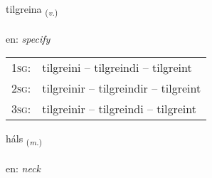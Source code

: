 \documentclass[frontgrid, backgrid]{flacards}\usepackage[]{graphicx}\usepackage[]{color}
\begin{document}
\renewcommand{\flhead}{\vskip5pt \fboxsep=0pt {\small\bfseries\footnotesize Sagnorð | Verb}}
\renewcommand{\fcfoot}{\vskip5pt \fboxsep=0pt \hspace{2pt}{\small\bfseries\footnotesize 2K}}

\renewcommand{\blhead}{\vskip5pt {\small\bfseries\footnotesize Sagnorð | Verb }}
\renewcommand{\bcfoot}{\vskip5pt \hspace{2pt}{\small\bfseries\footnotesize 2K}}


{tilgreina \small{\textsubscript{(\textit{v.})}} \\[1ex] %
\textphonetic{[tʰɪlkreina]} \\
en: \emph{specify} \\  [2ex]
\renewcommand*{\arraystretch}{0.8}
\begin{tabular}{p{1cm}l}
\textsc{1sg}: & tilgreini -- tilgreindi -- tilgreint \\ 
\textsc{2sg}: & tilgreinir -- tilgreindir -- tilgreint \\ 
\textsc{3sg}: & tilgreinir -- tilgreindi -- tilgreint \\ 
\end{tabular}
}

\renewcommand{\flhead}{\vskip5pt \fboxsep=0pt {\small\bfseries\footnotesize Nafnorð | Noun}}
\renewcommand{\fcfoot}{\vskip5pt \fboxsep=0pt \hspace{2pt}{\small\bfseries\footnotesize 2K}}

\renewcommand{\blhead}{\vskip5pt {\small\bfseries\footnotesize Nafnorð | Noun }}
\renewcommand{\bcfoot}{\vskip5pt \hspace{2pt}{\small\bfseries\footnotesize 2K}}


{háls \small{\textsubscript{(\textit{m.})}} \\[1ex] %
\textphonetic{[hauls]} \\
en: \emph{neck} \\  [2ex]
\renewcommand*{\arraystretch}{0.8}
}
\end{document}
